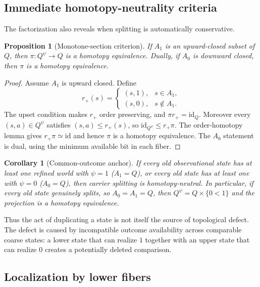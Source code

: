 \documentclass[11pt]{article}
\newtheorem{proposition}[theorem]{Proposition}
\newtheorem{corollary}[theorem]{Corollary}
\begin{document}
\subsection{Immediate homotopy-neutrality criteria}

The factorization also reveals when splitting is automatically conservative.

\begin{proposition}[Monotone-section criterion]\label{prop:monotone-section}
If $A_1$ is an upward-closed subset of $Q$, then $\pi:Q^\psi\to Q$ is a
homotopy equivalence.  Dually, if $A_0$ is downward closed, then $\pi$ is a
homotopy equivalence.
\end{proposition}

\begin{proof}
Assume $A_1$ is upward closed.  Define
\[
 r_+(s)=
 \begin{cases}
 (s,1),&s\in A_1,\\
 (s,0),&s\notin A_1.
 \end{cases}
\]
The upset condition makes $r_+$ order preserving, and $\pi r_+=\mathrm{id}_Q$.
Moreover every $(s,a)\in Q^\psi$ satisfies $(s,a)\leq r_+(s)$, so
$\mathrm{id}_{Q^\psi}\leq r_+\pi$.  The order-homotopy lemma gives
$r_+\pi\simeq\mathrm{id}$ and hence $\pi$ is a homotopy equivalence.  The
$A_0$ statement is dual, using the minimum available bit in each fiber.
\end{proof}

\begin{corollary}[Common-outcome anchor]
If every old observational state has at least one refined world with $\psi=1$
($A_1=Q$), or every old state has at least one with $\psi=0$ ($A_0=Q$), then
carrier splitting is homotopy-neutral.  In particular, if every old state genuinely
splits, so $A_0=A_1=Q$, then $Q^\psi=Q\times\{0<1\}$ and the projection is a
homotopy equivalence.
\end{corollary}

Thus the act of duplicating a state is not itself the source of topological defect.
The defect is caused by incompatible outcome availability across comparable coarse
states: a lower state that can realize $1$ together with an upper state that can
realize $0$ creates a potentially deleted comparison.

\subsection{Localization by lower fibers}
\end{document}
